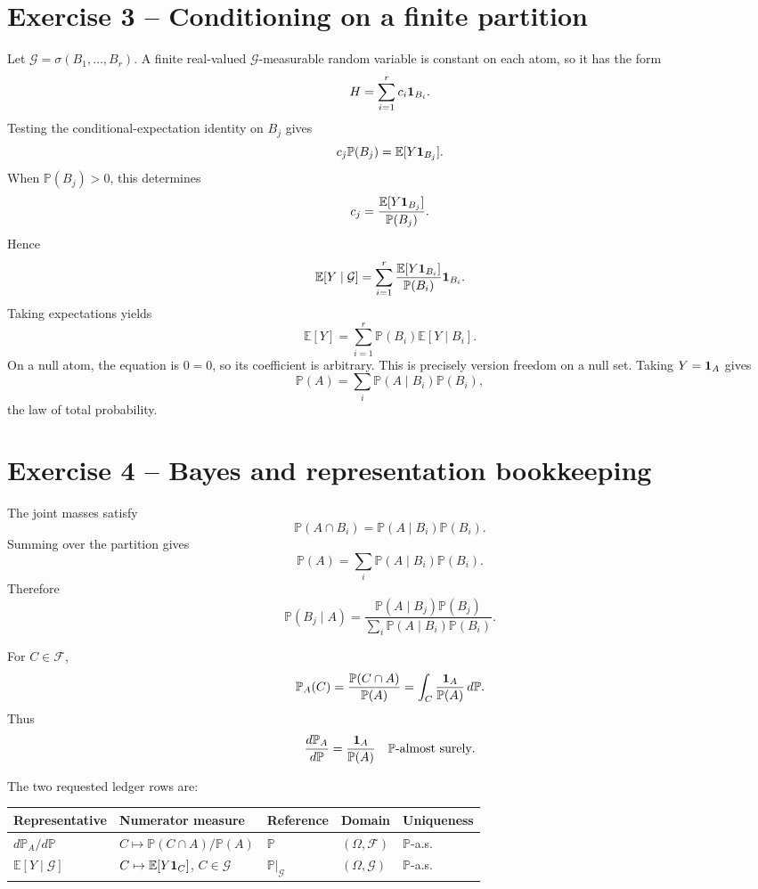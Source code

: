 \section*{Exercise 3 -- Conditioning on a finite partition}

Let $\mathcal G=\sigma(B_1,\ldots,B_r)$. A finite real-valued $\mathcal G$-measurable random variable is constant on each atom, so it has the form
\[
H=\sum_{i=1}^rc_i\mathbf 1_{B_i}.
\]
Testing the conditional-expectation identity on $B_j$ gives
\[
c_j\mathbb P(B_j)
=
\mathbb E[Y\mathbf 1_{B_j}].
\]
When $\mathbb P(B_j)>0$, this determines
\[
c_j
=
\frac{\mathbb E[Y\mathbf 1_{B_j}]}{\mathbb P(B_j)}.
\]
Hence
\[
\mathbb E[Y\mid\mathcal G]
=
\sum_{i=1}^r
\frac{\mathbb E[Y\mathbf 1_{B_i}]}{\mathbb P(B_i)}\mathbf 1_{B_i}.
\]
Taking expectations yields
\[
\mathbb E[Y]
=
\sum_{i=1}^r\mathbb P(B_i)\mathbb E[Y\mid B_i].
\]
On a null atom, the equation is $0=0$, so its coefficient is arbitrary. This is precisely version freedom on a null set. Taking $Y=\mathbf 1_A$ gives
\[
\mathbb P(A)
=
\sum_i\mathbb P(A\mid B_i)\mathbb P(B_i),
\]
the law of total probability.

\section*{Exercise 4 -- Bayes and representation bookkeeping}

The joint masses satisfy
\[
\mathbb P(A\cap B_i)
=
\mathbb P(A\mid B_i)\mathbb P(B_i).
\]
Summing over the partition gives
\[
\mathbb P(A)
=
\sum_i\mathbb P(A\mid B_i)\mathbb P(B_i).
\]
Therefore
\[
\mathbb P(B_j\mid A)
=
\frac{\mathbb P(A\mid B_j)\mathbb P(B_j)}
{\sum_i\mathbb P(A\mid B_i)\mathbb P(B_i)}.
\]

For $C\in\mathcal F$,
\[
\mathbb P_A(C)
=
\frac{\mathbb P(C\cap A)}{\mathbb P(A)}
=
\int_C\frac{\mathbf 1_A}{\mathbb P(A)}\,d\mathbb P.
\]
Thus
\[
\frac{d\mathbb P_A}{d\mathbb P}
=
\frac{\mathbf 1_A}{\mathbb P(A)}
\quad\mathbb P\text{-almost surely}.
\]

The two requested ledger rows are:

{\footnotesize
{}
\begin{tabularx}{\textwidth}{@{}Y Y Y Y Y@{}}
\toprule
Representative & Numerator measure & Reference & Domain & Uniqueness \\
\midrule
$d\mathbb P_A/d\mathbb P$ & $C\mapsto\mathbb P(C\cap A)/\mathbb P(A)$ & $\mathbb P$ & $(\Omega,\mathcal F)$ & $\mathbb P$-a.s. \\
$\mathbb E[Y\mid\mathcal G]$ & $C\mapsto\mathbb E[Y\mathbf 1_C]$, $C\in\mathcal G$ & $\mathbb P|_{\mathcal G}$ & $(\Omega,\mathcal G)$ & $\mathbb P$-a.s. \\
\bottomrule
\end{tabularx}
\par
}

